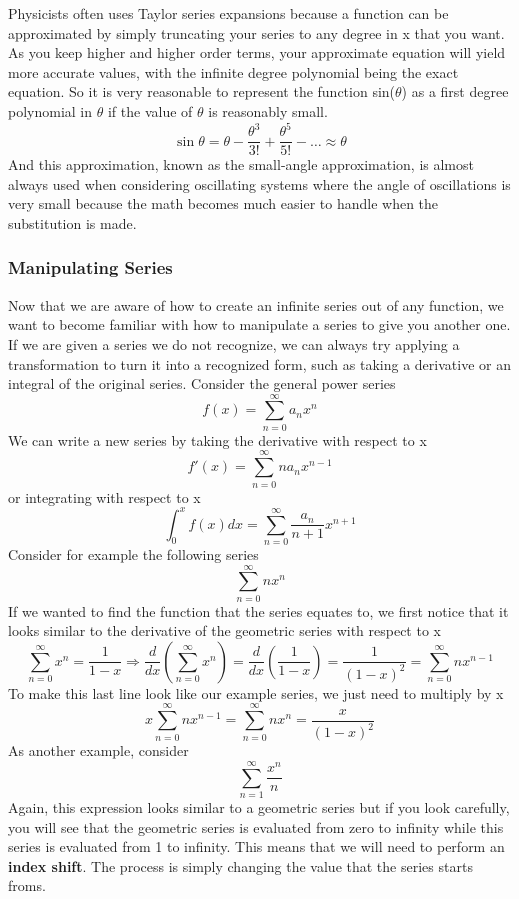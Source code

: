 \documentclass{article}
\newcommand{\be}{\begin{equation}}
\newcommand{\ee}{\end{equation}}
\newcommand{\sumzero}{\sum_{n=0}^\infty}
\newcommand{\sumone}{\sum_{n=1}^\infty}
\begin{document}
Physicists often uses Taylor series expansions because a function can be approximated by simply truncating your series to any degree in x that you want.
As you keep higher and higher order terms, your approximate equation will yield more accurate values, with the infinite degree polynomial being the exact equation.
So it is very reasonable to represent the function sin($\theta$) as a first degree polynomial in $\theta$ if the value of $\theta$ is reasonably small.
\be
\sin{\theta} = \theta - \frac{\theta^3}{3!} + \frac{\theta^5}{5!} - \hdots \approx \theta
\ee
And this approximation, known as the small-angle approximation, is almost always used when considering oscillating systems where the angle of oscillations is very small because the math becomes much easier to handle when the substitution is made.

\subsubsection*{Manipulating Series}
Now that we are aware of how to create an infinite series out of any function, we want to become familiar with how to manipulate a series to give you another one.
If we are given a series we do not recognize, we can always try applying a transformation to turn it into a recognized form, such as taking a derivative or an integral of the original series.
Consider the general power series
\be
f(x) = \sumzero a_nx^n
\ee
We can write a new series by taking the derivative with respect to x
\be
f'(x) = \sumzero na_nx^{n-1}
\ee
or integrating with respect to x
\be
\int_{0}^{x} f(x) dx = \sumzero \frac{a_n}{n+1}x^{n+1}
\ee
Consider for example the following series
\be
\sumzero nx^n
\ee
If we wanted to find the function that the series equates to, we first notice that it looks similar to the derivative of the geometric series with respect to x
\be
	\sumzero x^n = \frac{1}{1-x} \Rightarrow \frac{d}{dx} \left( \sumzero x^n\right) = \frac{d}{dx} \left( \frac{1}{1-x} \right) = \frac{1}{(1-x)^2} = \sumzero nx^{n-1}
\ee
To make this last line look like our example series, we just need to multiply by x
\be
x \sumzero nx^{n-1} = \sumzero nx^{n} = \frac{x}{(1-x)^2}
\ee
As another example, consider
\be
\sumone \frac{x^n}{n}
\ee
Again, this expression looks similar to a geometric series but if you look carefully, you will see that the geometric series is evaluated from zero to infinity while this series is evaluated from 1 to infinity.
This means that we will need to perform an \textbf{index shift}.
The process is simply changing the value that the series starts froms.
\end{document}
